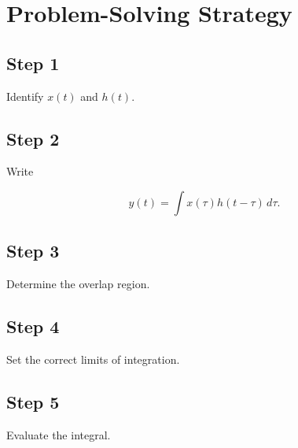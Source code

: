 
\section{Problem-Solving Strategy}


\subsection{Step 1}

Identify \(x(t)\) and \(h(t)\).


\subsection{Step 2}

Write

\[
y(t)=\int x(\tau)h(t-\tau)\,d\tau.
\]


\subsection{Step 3}

Determine the overlap region.


\subsection{Step 4}

Set the correct limits of integration.


\subsection{Step 5}

Evaluate the integral.


